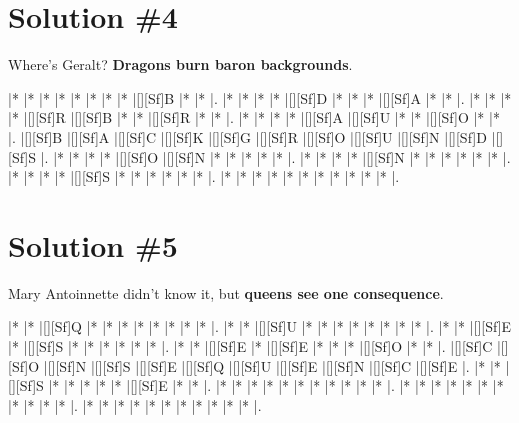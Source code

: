 \documentclass[letterpaper]{article}
\begin{document}
\newpage
\section*{Solution \#4}
Where's Geralt?
\newline\textbf{Dragons burn baron backgrounds}.

\vspace*{1em}
\begin{Puzzle}{11}{9}
|*        |*        |*        |*        |*        |*        |*        |*        |[][Sf]B  |*        |*        |. 
|*        |*        |*        |*        |[][Sf]D  |*        |*        |*        |[][Sf]A  |*        |*        |.  
|*        |*        |*        |*        |[][Sf]R  |[][Sf]B  |*        |*        |[][Sf]R  |*        |*        |.
|*        |*        |*        |*        |[][Sf]A  |[][Sf]U  |*        |*        |[][Sf]O  |*        |*        |.  
|[][Sf]B  |[][Sf]A  |[][Sf]C  |[][Sf]K  |[][Sf]G  |[][Sf]R  |[][Sf]O  |[][Sf]U  |[][Sf]N  |[][Sf]D  |[][Sf]S  |.
|*        |*        |*        |*        |[][Sf]O  |[][Sf]N  |*        |*        |*        |*        |*        |. 
|*        |*        |*        |*        |[][Sf]N  |*        |*        |*        |*        |*        |*        |.
|*        |*        |*        |*        |[][Sf]S  |*        |*        |*        |*        |*        |*        |.
|*        |*        |*        |*        |*        |*        |*        |*        |*        |*        |*        |.
\end{Puzzle}

\newpage
\section*{Solution \#5}
Mary Antoinnette didn't know it, but \textbf{queens see one consequence}.

\vspace*{1em}
\begin{Puzzle}{11}{9}
|*        |*        |[][Sf]Q  |*        |*        |*        |*        |*        |*        |*        |*        |. 
|*        |*        |[][Sf]U  |*        |*        |*        |*        |*        |*        |*        |*        |.  
|*        |*        |[][Sf]E  |*        |[][Sf]S  |*        |*        |*        |*        |*        |*        |.
|*        |*        |[][Sf]E  |*        |[][Sf]E  |*        |*        |*        |[][Sf]O  |*        |*        |.  
|[][Sf]C  |[][Sf]O  |[][Sf]N  |[][Sf]S  |[][Sf]E  |[][Sf]Q  |[][Sf]U  |[][Sf]E  |[][Sf]N  |[][Sf]C  |[][Sf]E  |.
|*        |*        |[][Sf]S  |*        |*        |*        |*        |*        |[][Sf]E  |*        |*        |. 
|*        |*        |*        |*        |*        |*        |*        |*        |*        |*        |*        |.
|*        |*        |*        |*        |*        |*        |*        |*        |*        |*        |*        |.
|*        |*        |*        |*        |*        |*        |*        |*        |*        |*        |*        |.
\end{Puzzle}
\end{document}

